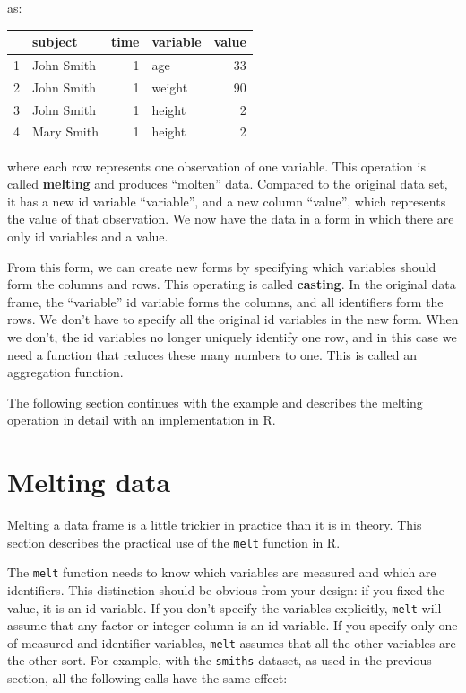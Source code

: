 \documentclass[oneside,letterpaper]{scrartcl}
\begin{document}
\bigskip
\noindent as:
\bigskip

\begin{tabular}{|l|l|r||l|r|}
\hline
 & subject & time & variable & value \\
\hline
1 & John Smith & 1 & age & 33 \\
2 & John Smith & 1 & weight & 90 \\
3 & John Smith & 1 & height & 2 \\
4 & Mary Smith & 1 & height & 2 \\
\hline
\end{tabular}

\bigskip
\noindent where each row represents one observation of one variable.  This operation is called {\bf melting} and produces ``molten'' data.  Compared to the original data set, it has a new id variable ``variable'', and a new column ``value'', which represents the value of that observation.  We now have the data in a form in which there are only id variables and a value.

From this form, we can create new forms by specifying which variables should form the columns and rows.  This operating is called {\bf casting}.  In the original data frame, the ``variable'' id variable forms the columns, and all identifiers form the rows.  We don't have to specify all the original id variables in the new form.  When we don't, the id variables no longer uniquely identify one row, and in this case we need a function that reduces these many numbers to one.  This is called an aggregation function. 

The following section continues with the example and describes the melting operation in detail with an implementation in R.

\newpage
\section{Melting data}\label{sec:melt}

Melting a data frame is a little trickier in practice than it is in theory.  This section describes the practical use of the {\tt melt} function in R.

The {\tt melt} function needs to know which variables are measured and which are identifiers.  This distinction should be obvious from your design: if you fixed the value, it is an id variable.  If you don't specify the variables explicitly, {\tt melt} will assume that any factor or integer column is an id variable.  If you specify only one of measured and identifier variables, {\tt melt} assumes that all the other variables are the other sort.  For example, with the {\tt smiths} dataset, as used in the previous section, all the following calls have the same effect:
\end{document}
